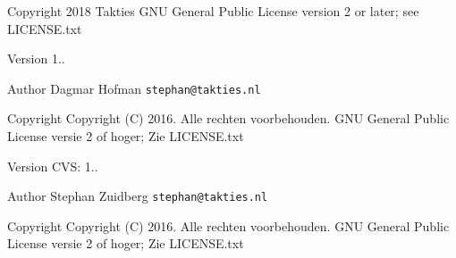\begin{DoxyCopyright}{Copyright}
2018 Takties  G\+NU General Public License version 2 or later; see L\+I\+C\+E\+N\+S\+E.\+txt
\end{DoxyCopyright}
\begin{DoxyVersion}{Version}
1..
\end{DoxyVersion}
\begin{DoxyAuthor}{Author}
Dagmar Hofman {\tt stephan@takties.\+nl} 
\end{DoxyAuthor}
\begin{DoxyCopyright}{Copyright}
Copyright (C) 2016. Alle rechten voorbehouden.  G\+NU General Public License versie 2 of hoger; Zie L\+I\+C\+E\+N\+S\+E.\+txt
\end{DoxyCopyright}
\begin{DoxyVersion}{Version}
C\+VS\+: 1..
\end{DoxyVersion}
\begin{DoxyAuthor}{Author}
Stephan Zuidberg {\tt stephan@takties.\+nl} 
\end{DoxyAuthor}
\begin{DoxyCopyright}{Copyright}
Copyright (C) 2016. Alle rechten voorbehouden.  G\+NU General Public License versie 2 of hoger; Zie L\+I\+C\+E\+N\+S\+E.\+txt 
\end{DoxyCopyright}
